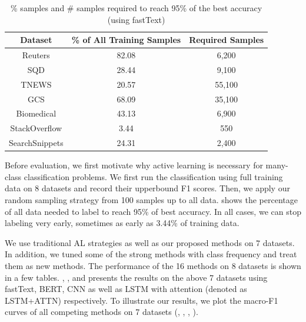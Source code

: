 \begin{table}[th]
	\scriptsize
	\centering
	\begin{tabular}{ccc}
		\toprule
		Dataset & \% of All Training Samples & Required Samples \\ \hline
		Reuters & 82.08   &  6,200 \\
		SQD     & 28.44   &  9,100 \\
		TNEWS   & 20.57    &  55,100 \\
		GCS     & 68.09   &  35,100 \\
		Biomedical & 43.13 & 6,900\\
		StackOverflow & 3.44 &550 \\
		SearchSnippets & 24.31 & 2,400 \\
		\bottomrule
	\end{tabular}
	\caption{\% samples and \# samples required to reach 95\% of the best accuracy (using fastText)}
	\label{table:all_radiusfreq}
\end{table}


Before evaluation, we first motivate why active learning is necessary for 
many-class classification problems. We first run the classification using full training data
on 8 datasets and record their upperbound F1 scores. Then, we apply our 
random sampling strategy from 100 samples up to all data.  
 shows the percentage of all data needed 
to label to reach 95\% of best accuracy. 
In all cases, we can stop labeling very early, sometimes as early as 3.44\% of
training data. 

We use traditional AL strategies as well as our proposed methods on $7$ datasets. 
In addition, we tuned some of the strong methods with class frequency and treat them as new methods. The performance of the 16 methods on 8 datasets is shown in a few tables. , ,  and  presents the results on the above 7 datasets using fastText, BERT, CNN as well as LSTM with attention (denoted as LSTM+ATTN) respectively. To illustrate our results, we plot the macro-F1 curves of 
all competing methods on 7 datasets (, , , ).

